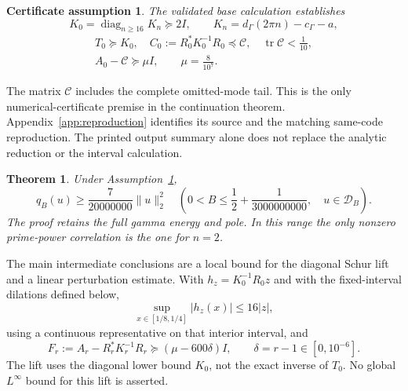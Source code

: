 \documentclass[11pt]{article}
\newtheorem{theorem}{Theorem}
\newtheorem{assumption}{Certificate assumption}
\newcommand{\norm}[1]{\lVert#1\rVert}
\begin{document}
\begin{assumption}\label{ass:certificate}
The validated base calculation establishes
\begin{equation}\label{a1}
 K_0=\operatorname{diag}_{n\ge16}K_n\succeq2I,\qquad
 K_n=d_\Gamma(2\pi n)-c_\Gamma-a,
\end{equation}
\begin{equation}\label{a2}
 \begin{gathered}
 T_0\succeq K_0,\quad
 C_0:=R_0^*K_0^{-1}R_0\preceq\mathcal C,\quad
 \operatorname{tr}\mathcal C<\frac1{10},\\
 A_0-\mathcal C\succeq\mu I,\qquad \mu=\frac8{10^7}.
 \end{gathered}
\end{equation}
\end{assumption}
The matrix $\mathcal C$ includes the complete omitted-mode tail. This
is the only numerical-certificate premise in the continuation theorem.
Appendix~\ref{app:reproduction} identifies its source and the matching
same-code reproduction. The printed output summary alone does not
replace the analytic reduction or the interval calculation.

\begin{theorem}\label{thm:main}
Under Assumption~\ref{ass:certificate},
\begin{equation}\label{i5}
 q_B(u)\ge\frac7{20000000}\norm u_2^2
 \quad\left(0<B\le\frac12+\frac1{3000000000},\quad
 u\in\mathcal D_B\right).
\end{equation}
The proof retains the full gamma energy and pole. In this range the
only nonzero prime-power correlation is the one for $n=2$.
\end{theorem}
The main intermediate conclusions are a local bound for the diagonal
Schur lift and a linear perturbation estimate. With
$h_z=K_0^{-1}R_0z$ and with the fixed-interval dilations defined below,
\begin{equation}\label{i3}
 \sup_{x\in[1/8,1/4]}|h_z(x)|\le16|z|,
\end{equation}
using a continuous representative on that interior interval, and
\begin{equation}\label{i4}
 F_r:=A_r-R_r^*K_r^{-1}R_r\succeq(\mu-600\delta)I,
 \qquad\delta=r-1\in[0,10^{-6}].
\end{equation}
The lift uses the diagonal lower bound $K_0$, not the exact inverse of
$T_0$. No global $L^\infty$ bound for this lift is asserted.
\end{document}
